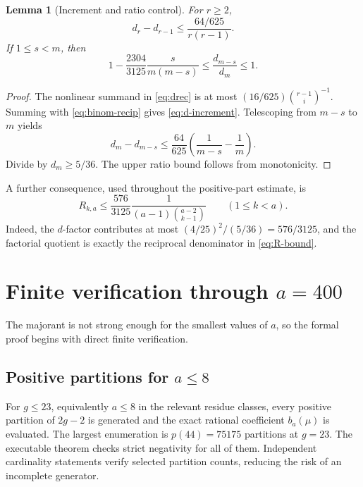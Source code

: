 \documentclass[11pt]{article}
\newtheorem{lemma}[theorem]{Lemma}
\theoremstyle{definition}
\theoremstyle{remark}
\begin{document}
\begin{lemma}[Increment and ratio control]\label{lem:d-ratio}
For $r\ge2$,
\begin{equation}\label{eq:d-increment}
  d_r-d_{r-1}\le\frac{64/625}{r(r-1)}.
\end{equation}
If $1\le s<m$, then
\begin{equation}\label{eq:d-ratio}
  1-\frac{2304}{3125}\frac{s}{m(m-s)}
  \le\frac{d_{m-s}}{d_m}\le1.
\end{equation}
\end{lemma}

\begin{proof}
The nonlinear summand in \eqref{eq:drec} is at most
$(16/625)\binom{r-1}{i}^{-1}$.  Summing with
\eqref{eq:binom-recip} gives \eqref{eq:d-increment}.  Telescoping from
$m-s$ to $m$ yields
\[
 d_m-d_{m-s}\le\frac{64}{625}
      \left(\frac1{m-s}-\frac1m\right).
\]
Divide by $d_m\ge5/36$.  The upper ratio bound follows from monotonicity.
\end{proof}

A further consequence, used throughout the positive-part estimate, is
\begin{equation}\label{eq:R-bound}
 R_{k,a}\le
 \frac{576}{3125}
 \frac1{(a-1)\binom{a-2}{k-1}}
 \qquad(1\le k<a).
\end{equation}
Indeed, the $d$-factor contributes at most
$(4/25)^2/(5/36)=576/3125$, and the factorial quotient is exactly the
reciprocal denominator in \eqref{eq:R-bound}.

\section{Finite verification through \texorpdfstring{$a=400$}{a=400}}\label{sec:finite}

The majorant is not strong enough for the smallest values of $a$, so the
formal proof begins with direct finite verification.

\subsection{Positive partitions for \texorpdfstring{$a\le8$}{a<=8}}

For $g\le23$, equivalently $a\le8$ in the relevant residue classes, every
positive partition of $2g-2$ is generated and the exact rational coefficient
$b_a(\mu)$ is evaluated.  The largest enumeration is $p(44)=75175$
partitions at $g=23$.  The executable theorem checks strict negativity for
all of them.  Independent cardinality statements verify selected partition
counts, reducing the risk of an incomplete generator.
\end{document}
